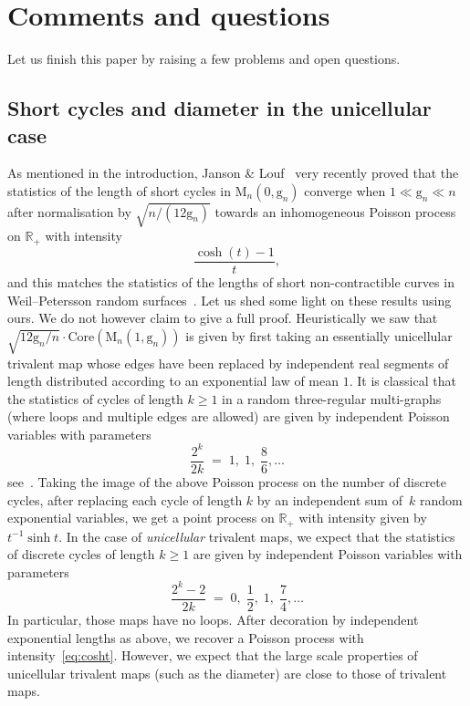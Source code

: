 \documentclass[JEP,XML,SOM,Unicode,NoFloatCountersInSection,NoEqCountersInSection]{cedram}
\theoremstyle{plain}
\theoremstyle{definition}
\theoremstyle{remark}
\newcommand{\R}{\mathbb{R}}
\newcommand{\Map}{\mathrm{M}}
\newcommand{\gen}{\mathrm{g}}
\begin{document}
\section{Comments and questions}
\label{sec:comments}

Let us finish this paper by raising a few problems and open questions.

\subsection{Short cycles and diameter in the unicellular case}

As mentioned in the introduction, Janson \& Louf~\cite{JL21b} very recently proved that the statistics of the length of short cycles in $ \Map_{n}(0, \gen_{n})$ converge when $ 1 \ll \gen_n \ll n$ after normalisation by $ \sqrt{n/(12 \gen_{n})}$ towards an inhomogeneous Poisson process on $\R_{+}$ with intensity
\begin{equation}\label{eq:cosht}
\frac{\cosh (t)-1}{t},
\end{equation}
and this matches the statistics of the lengths of short non-contractible curves in Weil--Petersson random surfaces~\cite{MP19}. Let us shed some light on these results using ours. We do not however claim to give a full proof. Heuristically we saw that $ \sqrt{12 \gen_{n}/n} \cdot \mathrm{Core}(\Map_{n}(1, \gen_n))$ is given by first taking an essentially unicellular trivalent map whose edges have been replaced by independent real segments of length distributed according to an exponential law of mean $1$.
It is classical that the statistics of cycles of length $k\geq 1$ in a random three-regular multi-graphs (where loops and multiple edges are allowed) are given by independent Poisson variables with parameters
\[
\frac{2^k}{2k} \;=\; 1,\;1,\;\frac{8}{6}, \dots
\]
see~\cite[Th.\,2.5]{Wor99}. Taking the image of the above Poisson process on the number of discrete cycles, after replacing each cycle of length $k$ by an independent sum of~$k$ random exponential variables, we get a point process on $\R_{+}$ with intensity given by $t^{-1} \sinh t$. In the case of \emph{unicellular} trivalent maps, we expect that the statistics of discrete cycles of length $k\geq 1$ are given by independent Poisson variables with parameters
\[
\frac{2^{k}-2}{2k} \;=\; 0,\;\frac{1}{2},\;1,\;\frac{7}{4}, \dots
\]
In particular, those maps have no loops. After decoration by independent exponential lengths as above, we recover a Poisson process with intensity~\eqref{eq:cosht}. However, we expect that the large scale properties of unicellular trivalent maps (such as the diameter) are close to those of trivalent maps.
\end{document}
